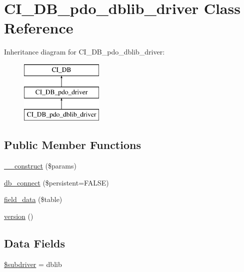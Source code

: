 \hypertarget{class_c_i___d_b__pdo__dblib__driver}{}\section{C\+I\+\_\+\+D\+B\+\_\+pdo\+\_\+dblib\+\_\+driver Class Reference}
\label{class_c_i___d_b__pdo__dblib__driver}
Inheritance diagram for C\+I\+\_\+\+D\+B\+\_\+pdo\+\_\+dblib\+\_\+driver\+:\begin{figure}[H]
\begin{center}
\leavevmode
\includegraphics[height=3.000000cm]{class_c_i___d_b__pdo__dblib__driver}
\end{center}
\end{figure}
\subsection*{Public Member Functions}
\begin{DoxyCompactItemize}
\item 
\mbox{\hyperlink{class_c_i___d_b__pdo__dblib__driver_a9162320adff1a1a4afd7f2372f753a3e}{\+\_\+\+\_\+construct}} (\$params)
\item 
\mbox{\hyperlink{class_c_i___d_b__pdo__dblib__driver_a52bf595e79e96cc0a7c907a9b45aeb4d}{db\+\_\+connect}} (\$persistent=F\+A\+L\+SE)
\item 
\mbox{\hyperlink{class_c_i___d_b__pdo__dblib__driver_a90355121e1ed009e0efdbd544ab56efa}{field\+\_\+data}} (\$table)
\item 
\mbox{\hyperlink{class_c_i___d_b__pdo__dblib__driver_a6080dae0886626b9a4cedb29240708b1}{version}} ()
\end{DoxyCompactItemize}
\subsection*{Data Fields}
\begin{DoxyCompactItemize}
\item 
\mbox{\hyperlink{class_c_i___d_b__pdo__dblib__driver_a1322ca756348b11d080cb7a4f590de15}{\$subdriver}} = \textquotesingle{}dblib\textquotesingle{}
\end{DoxyCompactItemize}
